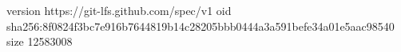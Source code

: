 version https://git-lfs.github.com/spec/v1
oid sha256:8f0824f3bc7e916b7644819b14c28205bbb0444a3a591befe34a01e5aac98540
size 12583008

